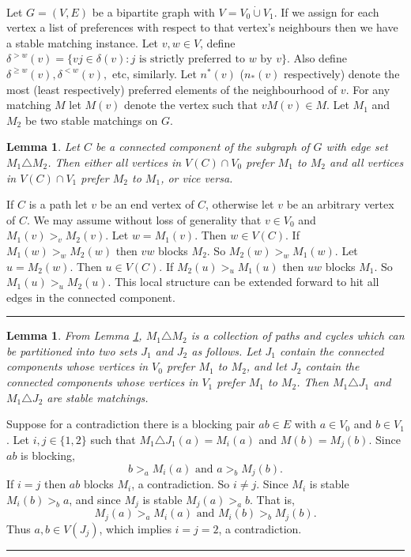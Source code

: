 \documentclass[preprint]{elsarticle}
\newtheorem{lemma}[fact]{Lemma}
\newenvironment{proof}{{\bf Proof:  }}{\hfill\rule{2mm}{2mm}}
\begin{document}
\paragraph{}
Let $G = (V, E)$ be a bipartite graph with $V = V_0 \dot\cup V_1$. If we assign for each vertex a list of preferences with respect to that vertex's neighbours then we have a stable matching instance. Let $v,w \in V$, define $\delta^{>w}(v) = \{vj \in \delta(v): j \text{ is strictly preferred to } w \text{ by } v\}$. Also define $ \delta^{\geq w}(v), \delta^{<w}(v),$ etc, similarly. Let $n^*(v)$ ($n_*(v)$ respectively) denote the most (least respectively) preferred elements of the neighbourhood of $v$. For any matching $M$ let $M(v)$ denote the vertex such that $vM(v) \in M$. Let $M_1$ and $M_2$ be two stable matchings on $G$.
\begin{lemma}
Let $C$ be a connected component of the subgraph of $G$ with edge set $M_1 \triangle M_2$. Then either all vertices in $V(C) \cap V_0$ prefer $M_1$ to $M_2$ and all vertices in $V(C) \cap V_1$ prefer $M_2$ to $M_1$, or vice versa.
\label{lemma:pref}
\end{lemma}
\begin{proof}
If $C$ is a path let $v$ be an end vertex of $C$, otherwise let $v$ be an arbitrary vertex of $C$. We may assume without loss of generality that $v \in V_0$ and $M_1(v) >_v M_2(v)$. Let $w = M_1(v)$. Then $w \in V(C)$. If $M_1(w) >_w M_2(w)$ then $vw$ blocks $M_2$. So $M_2(w) >_w M_1(w)$. Let $u=M_2(w)$. Then $u \in V(C)$. If $M_2(u) >_u M_1(u)$ then $uw$ blocks $M_1$. So $M_1(u) >_u M_2(u)$. This local structure can be extended forward to hit all edges in the connected component.
\end{proof}

\begin{lemma} From Lemma \ref{lemma:pref}, $M_1 \triangle M_2$ is a collection of paths and cycles which can be partitioned into two sets $J_1$ and $J_2$ as follows. Let $J_1$ contain the connected components whose vertices in $V_0$ prefer $M_1$ to $M_2$, and let $J_2$ contain the connected components whose vertices in $V_1$ prefer $M_1$ to $M_2$. Then $M_1 \triangle J_1$ and $M_1 \triangle J_2$ are stable matchings.
\label{lemma:symstable}
\end{lemma}
\begin{proof}
Suppose for a contradiction there is a blocking pair $ab \in E$ with $a \in V_0$ and $b \in V_1$. Let $i,j \in \{1,2\}$ such that $M_1\triangle J_1(a) = M_i(a)$ and $M(b) = M_j(b)$. Since $ab$ is blocking,
$$b >_a M_i(a) \text{ and } a >_b M_j(b). $$
If $i=j$ then $ab$ blocks $M_i$, a contradiction. So $i \neq j$. Since $M_i$ is stable $M_i(b) >_b a$, and since $M_j$ is stable $M_j(a) >_a b$. That is,
$$M_j(a) >_a M_i(a) \text{ and } M_i(b) >_b M_j(b).$$
Thus $a,b \in V(J_j)$, which implies $i=j=2$, a contradiction.
\end{proof}
\end{document}

